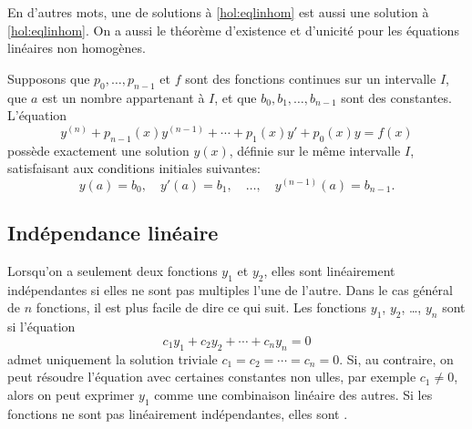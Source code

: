 En d'autres mots, une \emph{} de solutions à \eqref{hol:eqlinhom}
est aussi une solution à \eqref{hol:eqlinhom}.
On a aussi le théorème d'existence et d'unicité pour les équations linéaires non homogènes. 

\begin{theorem}
	Supposons que $p_0,\ldots, p_{n-1}$ et $f$ sont des fonctions continues sur un intervalle $I$,
	que $a$ est un nombre appartenant à $I$,
	et que $b_0, b_1, \ldots, b_{n-1}$ sont des constantes.
	L'équation  
	\begin{equation*} %
		y^{(n)} + p_{n-1}(x)y^{(n-1)} + \cdots + p_1(x) y' + p_0(x) y = f(x) 
	\end{equation*}
	possède exactement une solution $y(x)$, définie sur le même intervalle $I$, 
	satisfaisant aux conditions initiales suivantes: 
	\begin{equation*}
		y(a) = b_0, \quad y'(a) = b_1, \quad \ldots, \quad y^{(n-1)}(a) = b_{n-1} .
	\end{equation*}
\end{theorem}




\subsection{Indépendance linéaire}

Lorsqu'on a seulement deux fonctions $y_1$ et $y_2$, elles sont linéairement indépendantes si elles ne sont pas multiples l'une de l'autre. Dans le cas général de $n$ fonctions, il est plus facile de dire ce qui suit. 
Les fonctions  $y_1$, $y_2$, \ldots, $y_n$ sont \emph{} si l'équation
\begin{equation*}
	c_1 y_1 + c_2 y_2 + \cdots + c_n y_n = 0 
\end{equation*}
admet uniquement la solution triviale $c_1 = c_2 = \cdots = c_n = 0$.  
Si, au contraire, on peut résoudre l'équation avec certaines constantes non ulles, par exemple  $c_1 \not= 0$, alors on peut exprimer $y_1$ comme une combinaison linéaire des autres. 
Si les fonctions ne sont pas linéairement indépendantes, elles sont  \emph{}.

